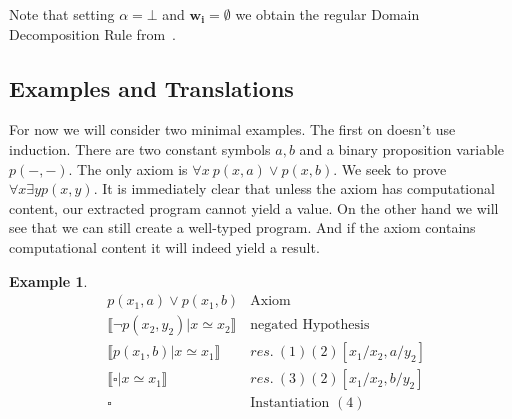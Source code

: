 \documentclass[onehalfspacing]{article}
\newtheorem{example}[theorem]{Example}
\newcommand{\llb}{\llbracket}
\newcommand{\rrb}{\rrbracket}
\begin{document}
Note that setting $\alpha=\bot$ and $\mathbf{w_i}=\emptyset$ we obtain the regular Domain Decomposition Rule from~\cite{Echenim_2019}.

\subsection{Examples and Translations}

For now we will consider two minimal examples. The first on doesn't use induction. There are two constant symbols $a, b$ and a binary proposition variable $p(-, -)$. The only axiom is $\forall x\:p(x,a)\vee p(x, b)$. We seek to prove $\forall x\exists y p(x, y)$. It is immediately clear that unless the axiom has computational content, our extracted program cannot yield a value. On the other hand we will see that we can still create a well-typed program. And if the axiom contains computational content it will indeed yield a result.




\begin{example}\hfill
	\begin{align}
		& p(x_1,a)\vee p(x_1, b) & \text{Axiom}\\
		& \llb \neg p(x_2, y_2) | x\simeq x_2\rrb & \text{negated Hypothesis}\\
		& \llb p(x_1, b) | x\simeq x_1\rrb & res.\:(1) (2) [x_1/x_2, a/y_2]\\
		& \llb \square | x\simeq x_1\rrb & res.\:(3) (2) [x_1/x_2, b/y_2]\\
		& \square &\text{Instantiation }(4)
	\end{align}
\end{example}
\end{document}
